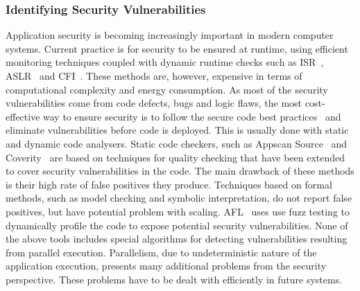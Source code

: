\documentclass[a4paper,11pt]{article}
\begin{document}
\subsubsection{Identifying Security Vulnerabilities}
\label{sect:security}

Application security is becoming increasingly important in modern computer systems.
Current practice is for security to be ensured at runtime, using efficient monitoring
techniques coupled with dynamic runtime checks such as ISR~\cite{isr}, ASLR~\cite{aslr}
and CFI~\cite{cfi}. These methods are, however, expensive in terms of computational
complexity and energy consumption. As most of the security vulnerabilities come from
code defects, bugs and logic flaws, the most cost-effective way to ensure security is
to follow the secure code best practices~\cite{OWASP} and eliminate vulnerabilities
before code is deployed. This is usually done with static and dynamic code analysers.
Static code checkers, such as Appscan Source~\cite{AppScan} and Coverity~\cite{Coverity}
are based on techniques for quality checking that
have been extended to cover security vulnerabilities in the code. The main drawback of 
these methods is their high rate of false positives they produce. Techniques based on
formal methods, such as model checking and symbolic interpretation, do not report false 
positives, but have potential problem with scaling. AFL~\cite{AFL} uses use fuzz testing 
to dynamically profile the code to expose potential security vulnerabilities. 
None of the above tools includes special algorithms for detecting vulnerabilities 
resulting from parallel execution. Parallelism, due to undeterministic nature of the
application execution, presents many additional problems from the security perspective. These problems have to be dealt with efficiently
in future systems.
\end{document}
